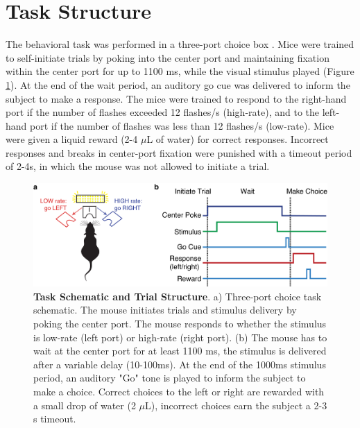 \section{Task Structure}
The behavioral task was performed in a three-port choice box \parencite{Uchida2003}. Mice were trained to self-initiate trials by poking into the center port and maintaining fixation within the center port for up to 1100 ms, while the visual stimulus played (Figure \ref{fig:taskstructure}). At the end of the wait period, an auditory go cue was delivered to inform the subject to make a response. The mice were trained to respond to the right-hand port if the number of flashes exceeded 12 flashes/s (high-rate), and to the left-hand port if the number of flashes was less than 12 flashes/s (low-rate). Mice were given a liquid reward (2-4 $\mu$L of water) for correct responses. Incorrect responses and breaks in center-port fixation were punished with a timeout period of 2-4s, in which the mouse was not allowed to initiate a trial. 
\begin{figure}
  \centering
  	\includegraphics[width=\textwidth]{Figures/chapter2/taskstructure.png}
  \caption[Task Structure]{\textbf{Task Schematic and Trial Structure}. a) Three-port choice task schematic. The mouse initiates trials and stimulus delivery by poking the center port. The mouse responds to whether the stimulus is low-rate (left port) or high-rate (right port). (b) The mouse has to wait at the center port for at least 1100 ms, the stimulus is delivered after a variable delay (10-100ms). At the end of the 1000ms stimulus period, an auditory "Go" tone is played to inform the subject to make a choice. Correct choices to the left or right are rewarded with a small drop of water (2 $\mu$L), incorrect choices earn the subject a 2-3 s timeout.}
   \label{fig:taskstructure}
\end{figure}

